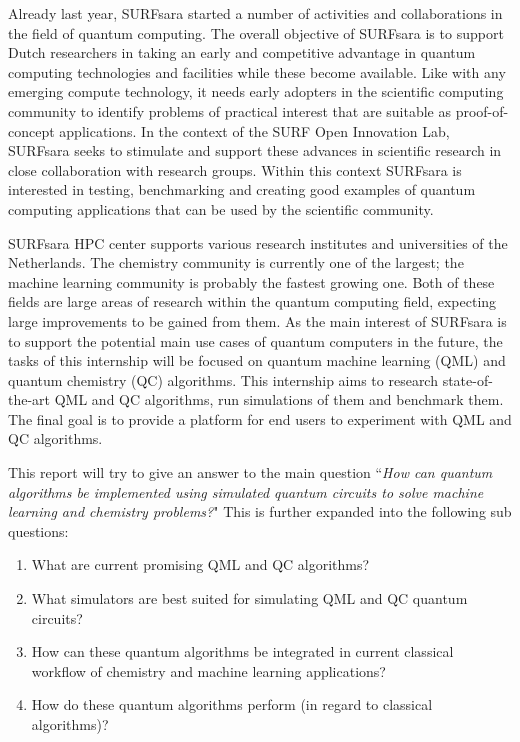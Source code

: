 \documentclass[a4paper,12pt]{article}
\begin{document}
Already last year, SURFsara started a number of activities and collaborations in the field of quantum computing.
The overall objective of SURFsara is to support Dutch researchers in taking an early and competitive advantage in quantum computing technologies and facilities while these become available.
Like with any  emerging compute technology, it needs early adopters in the scientific computing community to identify problems of practical interest that are suitable as proof-of-concept applications.
In the context of the SURF Open Innovation Lab, SURFsara seeks to stimulate and support these advances in scientific research in close collaboration with research groups.
Within this context SURFsara is interested in testing, benchmarking and creating good examples of quantum computing applications that can be used by the scientific community.

SURFsara HPC center supports various research institutes and universities of the Netherlands.
The chemistry community is currently one of the largest; the machine learning community is probably the fastest growing one.
Both of these fields are large areas of research within the quantum computing field, expecting large improvements to be gained from them.
As the main interest of SURFsara is to support the potential main use cases of quantum computers in the future, the tasks of this internship will be focused on quantum machine learning (QML) and quantum chemistry (QC) algorithms.
This internship aims to research state-of-the-art QML and QC algorithms, run simulations of them and benchmark them.
The final goal is to provide a platform for end users to experiment with QML and QC algorithms.

This report will try to give an answer to the main question ``\emph{How can quantum algorithms be implemented using simulated quantum circuits to solve machine learning and chemistry problems?}"
This is further expanded into the following sub questions:
\begin{enumerate}
	\item What are current promising QML and QC algorithms?
	\item What simulators are best suited for simulating QML and QC quantum circuits?
	\item How can these quantum algorithms be integrated in current classical workflow of chemistry and machine learning applications?
	\item How do these quantum algorithms perform (in regard to classical algorithms)?
\end{enumerate}
\end{document}
